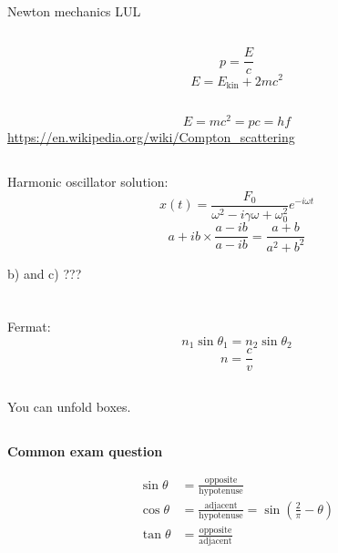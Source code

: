 \documentclass[12pt]{report}
\newcommand{\exam}{\begin{center}
\textbf{Common exam question}
\end{center}}
\begin{document}
\subsection{}
Newton mechanics LUL

\subsection{}
\[p=\frac{E}{c}\]
\[E=E_\mathrm{kin}+2mc^2\]

\subsection{}

\[E=mc^2=pc=hf\]
\url{https://en.wikipedia.org/wiki/Compton_scattering}

\subsection{}
Harmonic oscillator solution:
\[x(t)=\frac{F_0}{\omega^2-i\gamma\omega+\omega_0^2}e^{-i\omega t}\]
\[a+ib\times\frac{a-ib}{a-ib}=\frac{a+b}{a^2+b^2}\]

b) and c) ???

\section{}

\subsection{}
Fermat:
\[n_1\sin\theta_1=n_2\sin\theta_2\]
\[n=\frac{c}{v}\]

\subsection{}
You can unfold boxes.

\subsection{}
\exam
\begin{align*}
\sin\theta&=\mathrm{\frac{opposite}{hypotenuse}}\\
\cos\theta&=\mathrm{\frac{adjacent}{hypotenuse}}=\sin\left(\frac{2}{\pi}-\theta\right)\\
\tan\theta&=\mathrm{\frac{opposite}{adjacent}}
\end{align*}

\subsection{}
\end{document}
